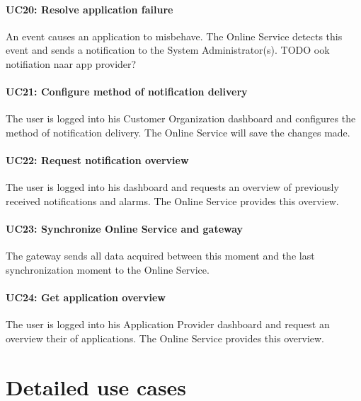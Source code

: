 \documentclass[english,peerreview]{sareport}
\begin{document}
\paragraph{UC20: Resolve application failure}
An event causes an application to misbehave. The Online Service detects this event and sends a notification to the System Administrator(s). TODO ook notifiation naar app provider?

\paragraph{UC21: Configure method of notification delivery}
The user is logged into his Customer Organization dashboard and configures the method of notification delivery. The Online Service will save the changes made.

\paragraph{UC22: Request notification overview}
The user is logged into his dashboard and requests an overview of previously received notifications and alarms. The Online Service provides this overview.

\paragraph{UC23: Synchronize Online Service and gateway}
The gateway sends all data acquired between this moment and the last synchronization moment to the Online Service.

\paragraph{UC24: Get application overview}
The user is logged into his Application Provider dashboard and request an overview their of applications. The Online Service provides this overview.



\section{Detailed use cases}
\end{document}
